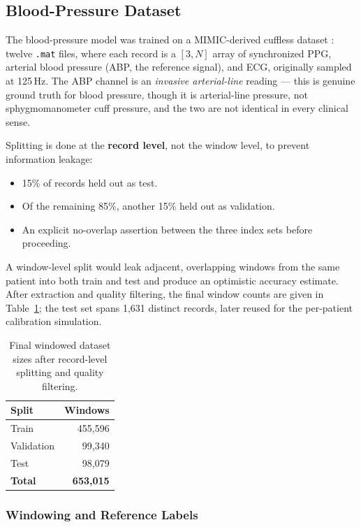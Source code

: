 \documentclass[12pt,a4paper]{report}
\begin{document}
\subsection{Blood-Pressure Dataset}

The blood-pressure model was trained on a MIMIC-derived cuffless dataset
\cite{mimic3}: twelve \texttt{.mat} files, where each record is a
$[3, N]$ array of synchronized PPG, arterial blood pressure (ABP, the reference
signal), and ECG, originally sampled at 125\,Hz. The ABP channel is an
\emph{invasive arterial-line} reading --- this is genuine ground truth for
blood pressure, though it is arterial-line pressure, not sphygmomanometer cuff
pressure, and the two are not identical in every clinical sense.

Splitting is done at the \textbf{record level}, not the window level, to prevent
information leakage:

\begin{itemize}[leftmargin=1.4em]
  \item 15\% of records held out as test.
  \item Of the remaining 85\%, another 15\% held out as validation.
  \item An explicit no-overlap assertion between the three index sets before
  proceeding.
\end{itemize}

A window-level split would leak adjacent, overlapping windows from the same
patient into both train and test and produce an optimistic accuracy estimate.
After extraction and quality filtering, the final window counts are given in
Table~\ref{tab:splits}; the test set spans 1{,}631 distinct records, later
reused for the per-patient calibration simulation.

\begin{table}[H]
\centering
\caption{Final windowed dataset sizes after record-level splitting and quality
filtering.}
\label{tab:splits}
\begin{tabular}{@{}lr@{}}
\toprule
\textbf{Split} & \textbf{Windows} \\
\midrule
Train & 455{,}596 \\
Validation & 99{,}340 \\
Test & 98{,}079 \\
\midrule
\textbf{Total} & \textbf{653{,}015} \\
\bottomrule
\end{tabular}
\end{table}

\subsubsection{Windowing and Reference Labels}
\end{document}
